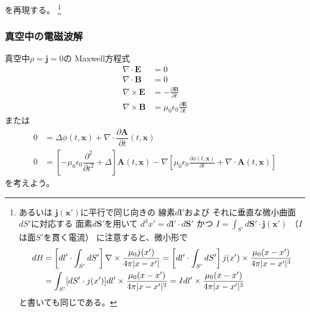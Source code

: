 を再現する。
\footnote{
  あるいは
  $\bm{j}(\bm{x}')$に平行で同じ向きの
  線素$d \bm{l}'$および
  それに垂直な微小曲面$dS'$に対応する
  面素$d \bm{S}'$を用いて
  $d^3 x' = d \bm{l}' \cdot d \bm{S}'$
  かつ
  $I = \int_{S'} d \bm{S}' \cdot \bm{j}(\bm{x}')$
  （$I$は面$S'$を貫く電流）
  に注意すると、微小形で
  \begin{align}
    d B
  &=
    \left[
      d l' \cdot
      \int_{S'} d S'
    \right]
    \nabla \times
      \dfrac{
        \mu_0 j (x')
      }{
        4 \pi
        |x - x'|
      }
  =
    \left[
      d l' \cdot
      \int_{S'} d S'
    \right]
    j (x') \times
      \dfrac{
        \mu_0
        (x - x')
      }{
        4 \pi
        |x - x'|^3
      }
  \notag\\&
  =
    \int_{S'}
      [d S' \cdot j (x')]
    d l' \times
      \dfrac{
        \mu_0
        (x - x')
      }{
        4 \pi
        |x - x'|^3
      }
  =
    I d l'
    \times
      \dfrac{
        \mu_0
        (x - x')
      }{
        4 \pi
        |x - x'|^3
      }
  \end{align}
  と書いても同じである。
}

\subsubsection{真空中の電磁波解}

真空中$\rho = \bm{j} = 0$の
Maxwell方程式
\begin{subequations}
\begin{align}
  \nabla \cdot \bm{E}
&=
  0
\\
  \nabla \cdot \bm{B}
&= 0
\\
  \nabla \times \bm{E}
&=
  - \frac{\partial \bm{B}}
    {\partial t}
\\
  \nabla \times \bm{B}
&=
  \mu_0 \epsilon_0
    \frac{\partial \bm{E}}
      {\partial t}
\end{align}
\end{subequations}
または
\begin{subequations}
\begin{align}
  0
&=
    \Delta \phi (t, \bm{x})
  +
    \nabla \cdot
    \dfrac{\partial \bm{A}}
      {\partial t} (t, \bm{x})
\\
  0
&=
  \left[
    - \mu_0 \epsilon_0
    \dfrac{\partial^2}{\partial t^2}
  +
    \Delta
  \right]
    \bm{A} (t, \bm{x})
  -
  \nabla
  \left[
    \mu_0 \epsilon_0
    \frac{\partial \phi (t, \bm{x})}
      {\partial t}
  +
    \nabla \cdot
      \bm{A} (t, \bm{x})
  \right]
\end{align}
\label{maxwell eq of potentials in vacuum}
\end{subequations}
を考えよう。


